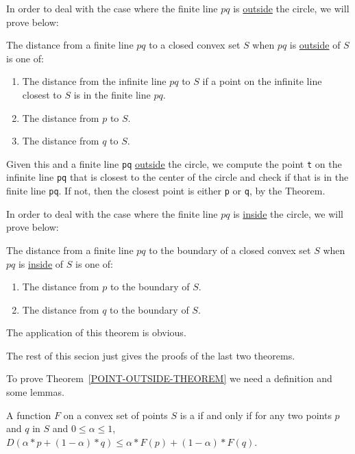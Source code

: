 \documentclass[12pt]{article}
\begin{document}
In order to deal with the case where the finite line $pq$ is
\underline{outside}
the circle, we will prove below:

\begin{theorem}\label{POINT-OUTSIDE-THEOREM}
The distance from a finite line $pq$ to a closed convex set $S$ when
$pq$ is \underline{outside} of $S$ is one of:
\begin{enumerate}
\item The distance from the infinite line $pq$ to $S$ if
a point on the infinite line closest to $S$ is in the finite line $pq$.
\item The distance from $p$ to $S$.
\item The distance from $q$ to $S$.
\end{enumerate}
\end{theorem}

Given this and a finite line {\tt pq} \underline{outside} the
circle,
we compute the point {\tt t} on the infinite line {\tt pq} that is
closest to the center of the circle
and check if that is in the finite line {\tt pq}.  If not, then the
closest point is either {\tt p} or {\tt q}, by the Theorem.

In order to deal with the case where the finite line $pq$ is
\underline{inside}
the circle, we will prove below:

\begin{theorem}\label{POINT-INSIDE-THEOREM}
The distance from a finite line $pq$ to the boundary of a
closed convex set $S$ when
$pq$ is \underline{inside} of $S$ is one of:
\begin{enumerate}
\item The distance from $p$ to the boundary of $S$.
\item The distance from $q$ to the boundary of $S$.
\end{enumerate}
\end{theorem}

The application of this theorem is obvious.

The rest of this secion just gives the proofs of the last two
theorems.

To prove Theorem~\ref{POINT-OUTSIDE-THEOREM}
we need a definition and some lemmas.

\begin{definition}
A function $F$ on a convex set of points $S$ is a 
if and only if
for any two points $p$ and $q$ in $S$ and
$0\le\alpha\le 1$,
$D(\alpha*p+(1-\alpha)*q)\le\alpha*F(p) + (1-\alpha)*F(q)$.
\end{definition}
\end{document}
